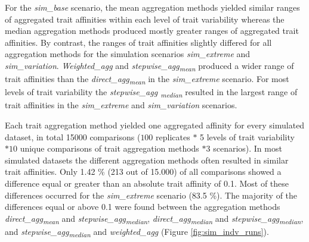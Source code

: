 \documentclass{article}
\begin{document}
For the \textit{sim\_base} scenario, the mean aggregation methods yielded similar ranges of aggregated trait affinities within each level of trait variability whereas the median aggregation methods produced mostly greater ranges of aggregated trait affinities. By contrast, the ranges of trait affinities slightly differed for all aggregation methods for the simulation scenarios \textit{sim\_extreme} and \textit{sim\_variation}. \textit{Weighted\_agg} and \textit{stepwise\_agg\textsubscript{mean}} produced a wider range of trait affinities than the \textit{direct\_agg\textsubscript{mean}} in the \textit{sim\_extreme} scenario. For most levels of trait variability the \textit{stepwise\_agg \textsubscript{median}} resulted in the largest range of trait affinities in the \textit{sim\_extreme} and \textit{sim\_variation} scenarios.

Each trait aggregation method yielded one aggregated affinity for every simulated dataset, in total 15000 comparisons ($100$ replicates $*$ 5 levels of trait variability $* 10$ unique comparisons of trait aggregation methods $* 3$ scenarios). In most simulated datasets the different aggregation methods often resulted in similar trait affinities. Only 1.42 \% (213 out of 15.000) of all comparisons showed a difference equal or greater than an absolute trait affinity of 0.1. Most of these differences occurred for the \textit{sim\_extreme} scenario (83.5 \%). The majority of the differences equal or above 0.1 were found between the aggregation methods \textit{direct\_agg\textsubscript{mean}} and \textit{stepwise\_agg\textsubscript{median}}, \textit{direct\_agg\textsubscript{median}} and \textit{stepwise\_agg\textsubscript{median}}, and \textit{stepwise\_agg\textsubscript{median}} and \textit{weighted\_agg} (Figure \ref{fig:sim_indv_runs}). 
\end{document}
